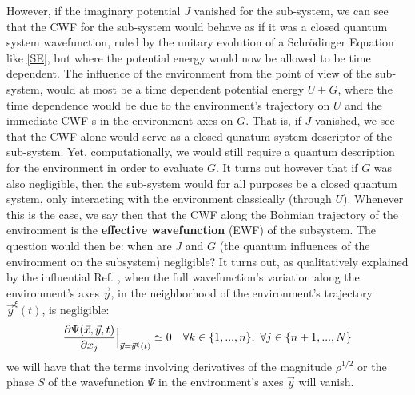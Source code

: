 \documentclass[11pt, a4paper]{article} %
\begin{document}


However, if the imaginary potential $J$ vanished for the sub-system, we can see that the CWF for the sub-system would behave as if it was a closed quantum system wavefunction, ruled by the unitary evolution of a Schrödinger Equation like \eqref{SE}, but where the potential energy would now be allowed to be time dependent. The influence of the environment from the point of view of the sub-system, would at most be a time dependent potential energy $U+G$, where the time dependence would be due to the environment's trajectory on $U$ and the immediate CWF-s in the environment axes on $G$. That is, if $J$ vanished, we see that the CWF alone would serve as a closed qunatum system descriptor of the sub-system. Yet, computationally, we would still require a quantum description for the environment in order to evaluate $G$. It turns out however that if $G$ was also negligible, then the sub-system would for all purposes be a closed quantum system, only interacting with the environment classically (through $U$). Whenever this is the case, we say then that the CWF along the Bohmian trajectory of the environment is the {\bf effective wavefunction} (EWF) of the subsystem. The question would then be: when are $J$ and $G$ (the quantum influences of the environment on the subsystem) negligible? It turns out, as qualitatively explained by the influential Ref. \cite{Absolute}, when the full wavefunction's variation along the environment's axes $\vec{y}$, in the neighborhood of the environment's trajectory $\vec{y}^\xi(t)$, is negligible: 
\begin{equation}
\pdv{\Psi(\vec{x},\vec{y},t)}{x_j}\Big\rvert_{\vec{y}=\vec{y}^\xi(t)}\simeq 0  \quad \forall k\in\{1,...,n\}, \ \forall j\in\{n+1,...,N\}
\end{equation}
we will have that the terms involving derivatives of the magnitude $\rho^{1/2}$ or the phase $S$ of the wavefunction $\Psi$ in the environment's axes $\vec{y}$ will vanish.
\end{document}
